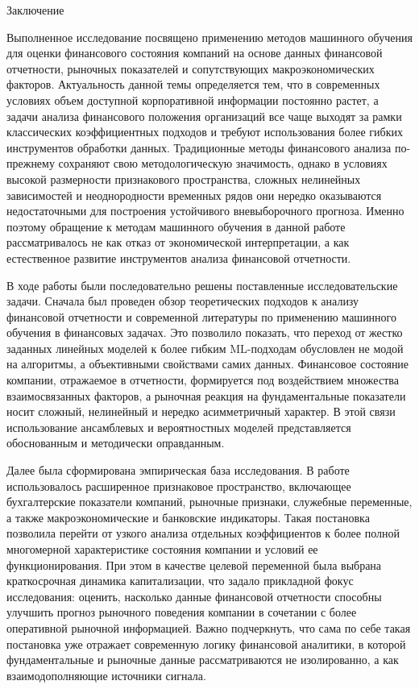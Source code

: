 \documentclass[
]{article}
\begin{document}
Заключение

Выполненное исследование посвящено применению методов машинного обучения для оценки финансового состояния компаний на основе данных финансовой отчетности, рыночных показателей и сопутствующих макроэкономических факторов. Актуальность данной темы определяется тем, что в современных условиях объем доступной корпоративной информации постоянно растет, а задачи анализа финансового положения организаций все чаще выходят за рамки классических коэффициентных подходов и требуют использования более гибких инструментов обработки данных. Традиционные методы финансового анализа по-прежнему сохраняют свою методологическую значимость, однако в условиях высокой размерности признакового пространства, сложных нелинейных зависимостей и неоднородности временных рядов они нередко оказываются недостаточными для построения устойчивого вневыборочного прогноза. Именно поэтому обращение к методам машинного обучения в данной работе рассматривалось не как отказ от экономической интерпретации, а как естественное развитие инструментов анализа финансовой отчетности.

В ходе работы были последовательно решены поставленные исследовательские задачи. Сначала был проведен обзор теоретических подходов к анализу финансовой отчетности и современной литературы по применению машинного обучения в финансовых задачах. Это позволило показать, что переход от жестко заданных линейных моделей к более гибким ML-подходам обусловлен не модой на алгоритмы, а объективными свойствами самих данных. Финансовое состояние компании, отражаемое в отчетности, формируется под воздействием множества взаимосвязанных факторов, а рыночная реакция на фундаментальные показатели носит сложный, нелинейный и нередко асимметричный характер. В этой связи использование ансамблевых и вероятностных моделей представляется обоснованным и методически оправданным.

Далее была сформирована эмпирическая база исследования. В работе использовалось расширенное признаковое пространство, включающее бухгалтерские показатели компаний, рыночные признаки, служебные переменные, а также макроэкономические и банковские индикаторы. Такая постановка позволила перейти от узкого анализа отдельных коэффициентов к более полной многомерной характеристике состояния компании и условий ее функционирования. При этом в качестве целевой переменной была выбрана краткосрочная динамика капитализации, что задало прикладной фокус исследования: оценить, насколько данные финансовой отчетности способны улучшить прогноз рыночного поведения компании в сочетании с более оперативной рыночной информацией. Важно подчеркнуть, что сама по себе такая постановка уже отражает современную логику финансовой аналитики, в которой фундаментальные и рыночные данные рассматриваются не изолированно, а как взаимодополняющие источники сигнала.
\end{document}
